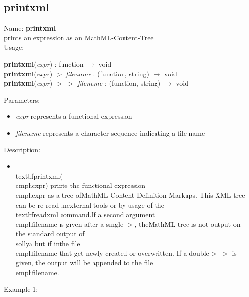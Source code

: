 \subsection{printxml}
\label{labprintxml}
\noindent Name: \textbf{printxml}\\
prints an expression as an MathML-Content-Tree\\
\noindent Usage: 
\begin{center}
\textbf{printxml}(\emph{expr}) : \textsf{function} $\rightarrow$ \textsf{void}\\
\textbf{printxml}(\emph{expr}) $>$ \emph{filename} : (\textsf{function}, \textsf{string}) $\rightarrow$ \textsf{void}\\
\textbf{printxml}(\emph{expr}) $>$ $>$ \emph{filename} : (\textsf{function}, \textsf{string}) $\rightarrow$ \textsf{void}\\
\end{center}
Parameters: 
\begin{itemize}
\item \emph{expr} represents a functional expression
\item \emph{filename} represents a character sequence indicating a file name
\end{itemize}
\noindent Description: \begin{itemize}

\item \\textbf{printxml}(\\emph{expr}) prints the functional expression \\emph{expr} as a tree of\n   MathML Content Definition Markups. This XML tree can be re-read in\n   external tools or by usage of the \\textbf{readxml} command.\n    \n   If a second argument \\emph{filename} is given after a single $>$, the\n   MathML tree is not output on the standard output of \\sollya but if in\n   the file \\emph{filename} that get newly created or overwritten. If a double\n   $>$ $>$ is given, the output will be appended to the file \\emph{filename}.\n\end{itemize}
\noindent Example 1: 
\begin{center}\begin{minipage}{15cm}\begin{Verbatim}[frame=single]
\end{Verbatim}
\end{minipage}\end{center}
